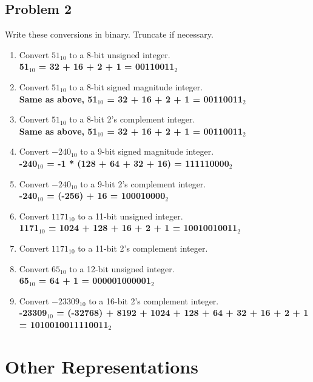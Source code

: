 \documentclass{article}
\begin{document}
\subsection*{Problem 2}
Write these conversions in binary. Truncate if necessary.
\begin{enumerate}[label=\alph*.]
    \item Convert $51_{10}$ to a 8-bit unsigned integer.\\
    \textbf{51$_{10}$ = 32 + 16 + 2 + 1 = 00110011$_2$}
    \item Convert $51_{10}$ to a 8-bit signed magnitude integer.\\
    \textbf{Same as above, 51$_{10}$ = 32 + 16 + 2 + 1 = 00110011$_2$}
    \item Convert $51_{10}$ to a 8-bit 2's complement integer.\\
    \textbf{Same as above, 51$_{10}$ = 32 + 16 + 2 + 1 = 00110011$_2$}
    \item Convert $-240_{10}$ to a 9-bit signed magnitude integer.\\
    \textbf{-240$_{10}$ = -1 * (128 + 64 + 32 + 16) = 111110000$_2$}
    \item Convert $-240_{10}$ to a 9-bit 2's complement integer.\\
    \textbf{-240$_{10}$ = (-256) + 16 = 100010000$_2$}
    \item Convert $1171_{10}$ to a 11-bit unsigned integer.\\
    \textbf{1171$_{10}$ = 1024 + 128 + 16 + 2 + 1 = 10010010011$_2$}
    \item Convert $1171_{10}$ to a 11-bit 2's complement integer.\\
    \textbf{}
    \item Convert $65_{10}$ to a 12-bit unsigned integer.\\
    \textbf{65$_{10}$ = 64 + 1 = 000001000001$_2$}
    \item Convert $-23309_{10}$ to a 16-bit 2's complement integer.\\
    \textbf{-23309$_{10}$ = (-32768) + 8192 + 1024 + 128 + 64 + 32 + 16 + 2 + 1 = 1010010011110011$_2$}
\end{enumerate}

\section*{Other Representations}
\end{document}
